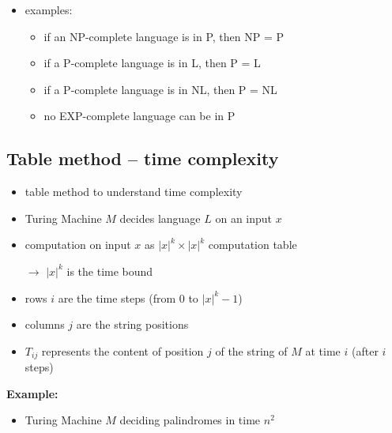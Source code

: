 \documentclass[a4]{scrartcl}
\begin{document}
\begin{itemize}

\item examples: 
\begin{itemize}
\item if an NP-complete language is in P, then NP = P 
\item if a P-complete language is in L, then P = L
\item if a P-complete language is in NL, then P = NL
\item no EXP-complete language can be in P
\end{itemize}

\end{itemize}

\subsection*{Table method -- time complexity}

\begin{itemize}
\item table method to understand time complexity
\item Turing Machine $M$ decides language $L$ on an input $x$
\item computation on input $x$ as $|x|^k \times |x|^k$ computation table
\item[$\rightarrow$] $|x|^k$ is the time bound
\item rows $i$ are the time steps (from $0$ to $|x|^k-1$)
\item columns $j$ are the string positions
\item $T_{ij}$ represents the content of position $j$ of the string of $M$ at time $i$ (after $i$ steps)
\end{itemize}

\textbf{Example:}

\begin{itemize}
\item Turing Machine $M$ deciding palindromes in time $n^2$
\end{itemize}
\end{document}
